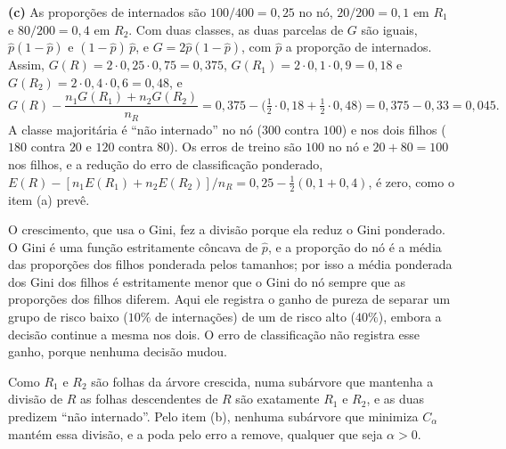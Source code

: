 \begin{solucao}
\smallskip
\textbf{(c)} As proporções de internados são $100/400=0{,}25$ no nó, $20/200=0{,}1$ em $R_1$ e
$80/200=0{,}4$ em $R_2$. Com duas classes, as duas parcelas de $G$ são iguais,
$\widehat p(1-\widehat p)$ e $(1-\widehat p)\,\widehat p$, e $G=2\widehat p(1-\widehat p)$, com
$\widehat p$ a proporção de internados. Assim, $G(R)=2\cdot0{,}25\cdot0{,}75=0{,}375$,
$G(R_1)=2\cdot0{,}1\cdot0{,}9=0{,}18$ e $G(R_2)=2\cdot0{,}4\cdot0{,}6=0{,}48$, e
\[
  G(R)-\frac{n_1G(R_1)+n_2G(R_2)}{n_R}
  =0{,}375-\big(\tfrac12\cdot0{,}18+\tfrac12\cdot0{,}48\big)=0{,}375-0{,}33=0{,}045 .
\]
A classe majoritária é ``não internado'' no nó ($300$ contra $100$) e nos dois filhos ($180$
contra $20$ e $120$ contra $80$). Os erros de treino são $100$ no nó e $20+80=100$ nos filhos, e a
redução do erro de classificação ponderado,
$E(R)-[n_1E(R_1)+n_2E(R_2)]/n_R=0{,}25-\tfrac12(0{,}1+0{,}4)$, é zero, como o item (a) prevê.

O crescimento, que usa o Gini, fez a divisão porque ela reduz o Gini ponderado. O Gini é uma
função estritamente côncava de $\widehat p$, e a proporção do nó é a média das proporções dos
filhos ponderada pelos tamanhos; por isso a média ponderada dos Gini dos filhos é estritamente
menor que o Gini do nó sempre que as proporções dos filhos diferem. Aqui ele registra o ganho de
pureza de separar um grupo de risco baixo ($10\%$ de internações) de um de risco alto ($40\%$),
embora a decisão continue a mesma nos dois. O erro de classificação não registra esse ganho,
porque nenhuma decisão mudou.

Como $R_1$ e $R_2$ são folhas da árvore crescida, numa subárvore que mantenha a divisão de $R$
as folhas descendentes de $R$ são exatamente $R_1$ e $R_2$, e as duas predizem ``não
internado''. Pelo item (b), nenhuma subárvore que minimiza $C_\alpha$ mantém essa divisão, e a
poda pelo erro a remove, qualquer que seja $\alpha>0$.
\end{solucao}
